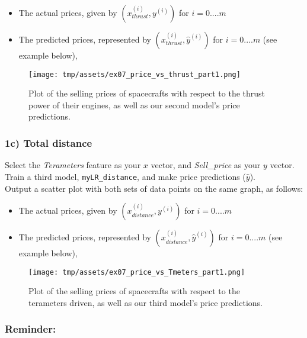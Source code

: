 \documentclass[]{article}
\begin{document}
\begin{itemize}
\item
  The actual prices, given by \((x_{thrust}^{(i)},y^{(i)})\) for
  \(i=0....m\)
\item
  The predicted prices, represented by
  \((x_{thrust}^{(i)},\hat{y}^{(i)})\) for \(i=0....m\) (see example
  below),
\end{itemize}

\begin{figure}
\centering
\texttt{[image: tmp/assets/ex07\_price\_vs\_thrust\_part1.png]}
\caption{Plot of the selling prices of spacecrafts with respect to the
thrust power of their engines, as well as our second model's price
predictions.}
\end{figure}

\hypertarget{c-total-distance}{%
\subsubsection{1c) Total distance}\label{c-total-distance}}

Select the \emph{Terameters} feature as your \(x\) vector, and
\emph{Sell\_price} as your \(y\) vector. Train a third model,
\texttt{myLR\_distance}, and make price predictions (\(\hat{y}\)).\\
Output a scatter plot with both sets of data points on the same graph,
as follows:

\begin{itemize}
\item
  The actual prices, given by \((x_{distance}^{(i)},y^{(i)})\) for
  \(i=0....m\)
\item
  The predicted prices, represented by
  \((x_{distance}^{(i)},\hat{y}^{(i)})\) for \(i=0....m\) (see example
  below),
\end{itemize}

\begin{figure}
\centering
\texttt{[image: tmp/assets/ex07\_price\_vs\_Tmeters\_part1.png]}
\caption{Plot of the selling prices of spacecrafts with respect to the
terameters driven, as well as our third model's price predictions.}
\end{figure}

\hypertarget{reminder}{%
\subsubsection{Reminder:}\label{reminder}}
\end{document}
